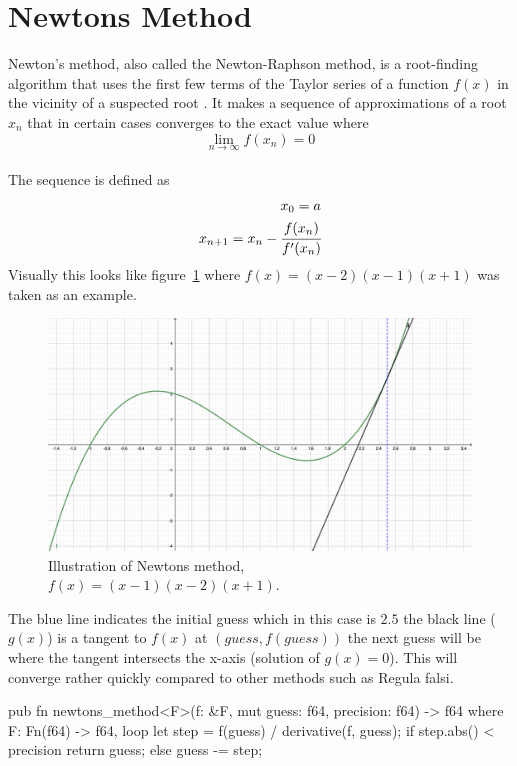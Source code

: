 \documentclass[11pt,DIV=10,final]{scrreprt} %
\begin{document}
{\section{Newtons Method}
Newton's method, also called the Newton-Raphson method, is a root-finding algorithm that uses the first few terms of the Taylor series of a function $f(x)$ in the vicinity of a suspected root
\citep{math:newton}. It makes a sequence of approximations of a root $x_{n}$ that in certain cases converges to the exact value where
\[
  \lim _{n \to \infty}f(x_{n}) = 0
\]
\\
The sequence is defined as
\begin{align*}
  x_{0}=a \\*
  x_{n+1}=x_{n}-\cfrac{f(x_{n})}{f'(x_{n})}
\end{align*}
Visually this looks like figure~\ref{fig:newton-ilust} where $f(x) = (x-2)(x-1)(x+1)$ was taken as an example.
\begin{figure}[H]
	\includegraphics[width=\textwidth]{plots/newtons-method.pdf}
	\caption{Illustration of Newtons method, $f(x) = (x-1)(x-2)(x+1)$.}
	\label{fig:newton-ilust}
\end{figure}
The blue line indicates the initial guess which in this case is $2.5$ the black line ($g(x)$) is a tangent to $f(x)$ at $(guess, f(guess))$ the next guess will be where
the tangent intersects the x-axis (solution of $g(x) = 0$). This will converge rather quickly compared to other methods such as Regula falsi.

\begin{rustcode}\nopagebreak
pub fn newtons_method<F>(f: &F, mut guess: f64, precision: f64) -> f64
    where
        F: Fn(f64) -> f64,
{
    loop {
        let step = f(guess) / derivative(f, guess);
        if step.abs() < precision {
            return guess;
        } else {
            guess -= step;
        }
    }
}
\end{rustcode}

}
\end{document}
